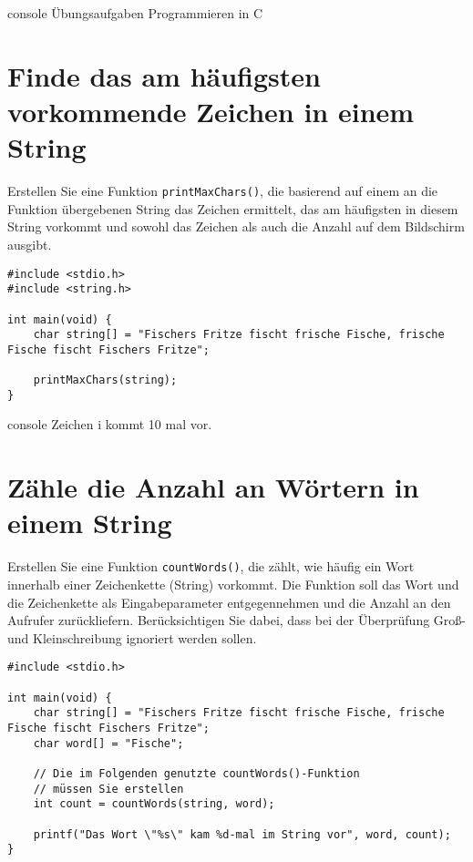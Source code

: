 \begin{mybox}[Bildschirmausgabe]{console}
    Übungsaufgaben Programmieren in C
\end{mybox}





\chapter{Finde das am häufigsten vorkommende Zeichen in einem String}

\vspace{10pt}

Erstellen Sie eine Funktion \texttt{printMaxChars()}, die basierend auf
einem an die Funktion übergebenen String das Zeichen ermittelt, das am
häufigsten in diesem String vorkommt und sowohl das Zeichen als auch die Anzahl
auf dem Bildschirm ausgibt.

\Vorlage
\begin{verbatim}
#include <stdio.h>
#include <string.h>

int main(void) {
    char string[] = "Fischers Fritze fischt frische Fische, frische Fische fischt Fischers Fritze";

    printMaxChars(string);
}
\end{verbatim}

\begin{mybox}[Bildschirmausgabe]{console}
Zeichen i kommt 10 mal vor.
\end{mybox}




\chapter{Zähle die Anzahl an Wörtern in einem String}

\vspace{10pt}

Erstellen Sie eine Funktion \texttt{countWords()}, die zählt, wie häufig
ein Wort innerhalb einer Zeichenkette (String) vorkommt. Die Funktion soll das
Wort und die Zeichenkette als Eingabeparameter entgegennehmen und die Anzahl an
den Aufrufer zurückliefern. Berücksichtigen Sie dabei, dass bei der Überprüfung
Groß- und Kleinschreibung ignoriert werden sollen.

\Vorlage
\begin{verbatim}
#include <stdio.h>

int main(void) {
    char string[] = "Fischers Fritze fischt frische Fische, frische Fische fischt Fischers Fritze";
    char word[] = "Fische";

    // Die im Folgenden genutzte countWords()-Funktion
    // müssen Sie erstellen
    int count = countWords(string, word);

    printf("Das Wort \"%s\" kam %d-mal im String vor", word, count);
}
\end{verbatim}

